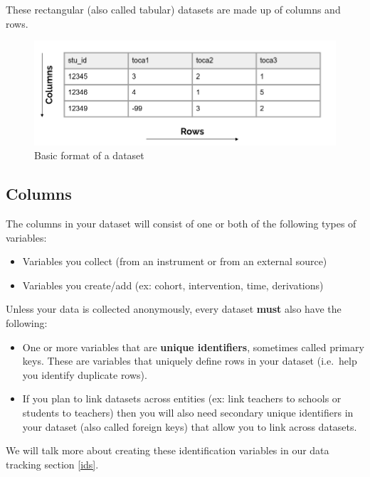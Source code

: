 \documentclass[
]{book}
\providecommand{\tightlist}{%
  \setlength{\itemsep}{0pt}\setlength{\parskip}{0pt}}
\begin{document}
These rectangular (also called tabular) datasets are made up of columns and rows.

\begin{figure}

{\centering \includegraphics[width=0.8\linewidth]{img/rectangle} 

}

\caption{Basic format of a dataset}\label{fig:unnamed-chunk-1}
\end{figure}

\hypertarget{columns}{%
\subsection{Columns}\label{columns}}

The columns in your dataset will consist of one or both of the following types of variables:

\begin{itemize}
\tightlist
\item
  Variables you collect (from an instrument or from an external source)
\item
  Variables you create/add (ex: cohort, intervention, time, derivations)
\end{itemize}

Unless your data is collected anonymously, every dataset \textbf{must} also have the following:

\begin{itemize}
\tightlist
\item
  One or more variables that are \textbf{unique identifiers}, sometimes called primary keys. These are variables that uniquely define rows in your dataset (i.e.~help you identify duplicate rows).
\item
  If you plan to link datasets across entities (ex: link teachers to schools or students to teachers) then you will also need secondary unique identifiers in your dataset (also called foreign keys) that allow you to link across datasets.
\end{itemize}

We will talk more about creating these identification variables in our data tracking section \ref{ids}.
\end{document}
